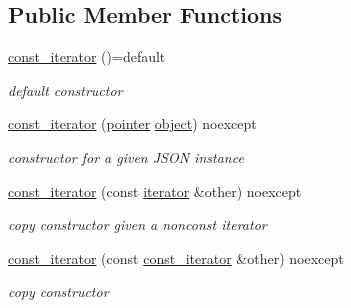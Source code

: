 \subsection*{Public Member Functions}
\begin{DoxyCompactItemize}
\item 
\hyperlink{classnlohmann_1_1basic__json_1_1const__iterator_ac6fdaff67857f82a623e5cc253917639}{const\+\_\+iterator} ()=default
\begin{DoxyCompactList}\small\item\em default constructor \end{DoxyCompactList}\item 
\hyperlink{classnlohmann_1_1basic__json_1_1const__iterator_a23de834b11bd895209aa65c100ab9ceb}{const\+\_\+iterator} (\hyperlink{classnlohmann_1_1basic__json_1_1const__iterator_a1da96fc3054d547e7706d3a2f073f389}{pointer} \hyperlink{classnlohmann_1_1basic__json_ad25b2f8c21e241e2d63455537a9294ff}{object}) noexcept
\begin{DoxyCompactList}\small\item\em constructor for a given J\+S\+ON instance \end{DoxyCompactList}\item 
\hyperlink{classnlohmann_1_1basic__json_1_1const__iterator_a6b950c6bc081ac1ec1540ec05ceb2603}{const\+\_\+iterator} (const \hyperlink{classnlohmann_1_1basic__json_1_1iterator}{iterator} \&other) noexcept
\begin{DoxyCompactList}\small\item\em copy constructor given a nonconst iterator \end{DoxyCompactList}\item 
\hyperlink{classnlohmann_1_1basic__json_1_1const__iterator_a18c35a6735d3da96b4fc026421c05dd8}{const\+\_\+iterator} (const \hyperlink{classnlohmann_1_1basic__json_1_1const__iterator}{const\+\_\+iterator} \&other) noexcept
\begin{DoxyCompactList}\small\item\em copy constructor \end{DoxyCompactList}\item 

\end{DoxyCompactItemize}
